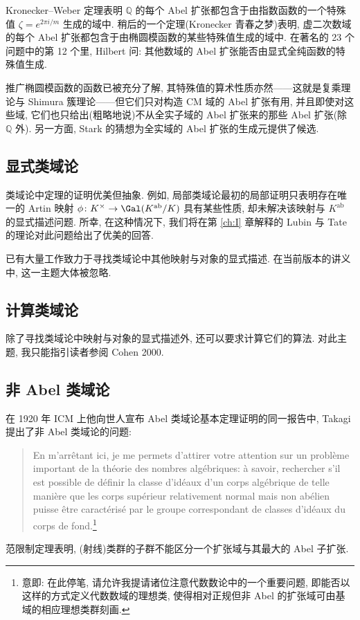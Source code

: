 Kronecker--Weber 定理表明 $\mathbb{Q}$ 的每个 Abel 扩张都包含于由指数函数的一个特殊值 $\zeta = e^{2\pi i/m}$ 生成的域中. 稍后的一个定理(Kronecker 青春之梦)表明, 虚二次数域的每个 Abel 扩张都包含于由椭圆模函数的某些特殊值生成的域中. 在著名的 23 个问题中的第 12 个里, Hilbert 问: 其他数域的 Abel 扩张能否由显式全纯函数的特殊值生成.

推广椭圆模函数的函数已被充分了解, 其特殊值的算术性质亦然——这就是复乘理论与 Shimura 簇理论——但它们只对构造 CM 域的 Abel 扩张有用, 并且即使对这些域, 它们也只给出(粗略地说)不从全实子域的 Abel 扩张来的那些 Abel 扩张(除 $\mathbb{Q}$ 外). 另一方面, Stark 的猜想为全实域的 Abel 扩张的生成元提供了候选.

\subsection*{显式类域论}

类域论中定理的证明优美但抽象. 例如, 局部类域论最初的局部证明只表明存在唯一的 Artin 映射 $\phi \colon K^{\times} \to \Gal(K^{\mathrm{ab}}/K)$ 具有某些性质, 却未解决该映射与 $K^{\mathrm{ab}}$ 的显式描述问题. 所幸, 在这种情况下, 我们将在第 \ref{ch:I} 章解释的 Lubin 与 Tate 的理论对此问题给出了优美的回答.

已有大量工作致力于寻找类域论中其他映射与对象的显式描述. 在当前版本的讲义中, 这一主题大体被忽略.

\subsection*{计算类域论}

除了寻找类域论中映射与对象的显式描述外, 还可以要求计算它们的算法. 对此主题, 我只能指引读者参阅 Cohen 2000\cite{Cohen2000}.

\subsection*{非 Abel 类域论}

在 1920 年 ICM 上他向世人宣布 Abel 类域论基本定理证明的同一报告中, Takagi 提出了非 Abel 类域论的问题:
\begin{quote}
En m'arrêtant ici, je me permets d'attirer votre attention sur un problème important de la théorie des nombres algébriques: à savoir, rechercher s'il est possible de définir la classe d'idéaux d'un corps algébrique de telle manière que les corps supérieur relativement normal mais non abélien puisse être caractérisé par le groupe correspondant de classes d'idéaux du corps de fond.\footnote{意即: 在此停笔, 请允许我提请诸位注意代数数论中的一个重要问题, 即能否以这样的方式定义代数数域的理想类, 使得相对正规但非 Abel 的扩张域可由基域的相应理想类群刻画.}
\end{quote}
范限制定理表明, (射线)类群的子群不能区分一个扩张域与其最大的 Abel 子扩张.


